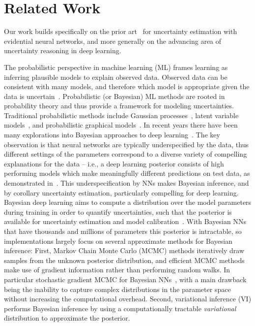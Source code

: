 \documentclass{article}
\begin{document}
\section{Related Work}
\label{sec:rw}
Our work builds specifically on the prior art~\cite{amini20} for uncertainty estimation with evidential neural networks, and more generally on the advancing area of uncertainty reasoning in deep learning.

The probabilistic perspective in machine learning (ML) frames learning as inferring plausible models to explain observed data.
Observed data can be consistent with many models, and therefore which model is appropriate given the data is uncertain~\cite{ghahramani15}.
Probabilistic (or Bayesian) ML methods are rooted in probability theory and thus provide a framework for modeling uncertainties.
Traditional probabilistic methods include Gaussian processes~\cite{rasmussen06}, latent variable models~\cite{bishop98}, and probabilistic graphical models~\cite{koller09}.
In recent years there have been many explorations into Bayesian approaches to deep learning~\cite{kendall17,neal96,guo17,wilson15,hafner18,ovadia19,izmailov19,seedat19}.
The key observation is that neural networks are typically underspecified by the data, thus different settings of the parameters correspond to a diverse variety of compelling explanations for the data -- i.e., a deep learning posterior consists of high performing models which make meaningfully different predictions on test data, as demonstrated in~\cite{izmailov19,garipov18,zolna19}.
This underspecification by NNs makes Bayesian inference, and by corollary uncertainty estimation, particularly compelling for deep learning.
Bayesian deep learning aims to compute a distribution over the model parameters during training in order to quantify uncertainties,
such that the posterior is available for uncertainty estimation and model calibration~\cite{guo17}.
With Bayesian NNs that have thousands and millions of parameters this posterior is intractable, so implementations largely focus on several approximate methods for Bayesian inference:
First, Markov Chain Monte Carlo (MCMC) methods iteratively draw samples from the unknown posterior distribution, and efficient MCMC methods make use of gradient information rather than performing random walks.
In particular stochastic gradient MCMC for Bayesian NNs~\cite{welling11,li16,park18,maddox19}, with a main drawback being the inability to capture complex distributions in the parameter space without increasing the computational overhead.
Second, variational inference (VI) performs Bayesian inference by using a computationally tractable \textit{variational} distribution to approximate the posterior.
\end{document}
